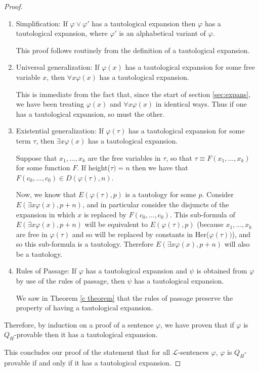 \documentclass[a4paper,12pt]{report}
\theoremstyle{definition}
\begin{document}
\begin{proof}
\begin{enumerate}[(i)]
\begin{enumerate}
\item Simplification: If $\varphi \lor \varphi'$ has a tautological expansion then $\varphi$ has a tautological expansion, where $\varphi'$ is an alphabetical variant of $\varphi$. 

This proof follows routinely from the definition of a tautological expansion.

\item Universal generalization: If $\varphi(x)$ has a tautological expansion for some free variable $x$, then $\forall x \varphi(x)$ has a tautological expansion. 

This is immediate from the fact that, since the start of section \ref{sec:expans}, we have been treating $\varphi(x)$ and $\forall x \varphi(x)$ in identical ways. Thus if one has a tautological expansion, so must the other.

\item Existential generalization: If $\varphi ( \tau )$ has a tautological expansion for some term $\tau$, then $\exists x \varphi (x)$ has a tautological expansion.

Suppose that $x_1, \ldots, x_k$ are the free variables in $\tau$, so that $\tau \equiv F(x_1, \ldots, x_k)$ for some function $F$. If height($\tau) = n$ then we have that $F(c_0, \ldots, c_0) \in D(\varphi(\tau), n)$.

Now, we know that $E(\varphi ( \tau ), p)$ is a tautology for some $p$. Consider $E(\exists x \varphi (x), p+n)$, and in particular consider the disjuncts of the expansion in which $x$ is replaced by $F(c_0, \ldots, c_0)$. This sub-formula of  $E(\exists x \varphi (x), p+n)$ will be equivalent to $E(\varphi ( \tau ), p)$ (because $x_1, \ldots, x_k$ are free in $\varphi ( \tau )$ and so will be replaced by constants in Her($\varphi ( \tau ))$), and so this sub-formula is a tautology. Therefore $E(\exists x \varphi (x), p+n)$ will also be a tautology.

\item Rules of Passage: If $\varphi$ has a tautological expansion and $\psi$ is obtained from $\varphi$ by use of the rules of passage, then $\psi$ has a tautological expansion.

We saw in Theorem \ref{c theorem} that the rules of passage preserve the property of having a tautological expansion.

\end{enumerate}

Therefore, by induction on a proof of a sentence $\varphi$, we have proven that if $\varphi$ is $Q_H$-provable then it has a tautological expansion.

\end{enumerate}

\noindent This concludes our proof of the statement that for all $\mathcal{L}$-sentences $\varphi$, $\varphi$ is $Q_H$-provable if and only if it has a tautological expansion.
\end{proof}
\end{document}
